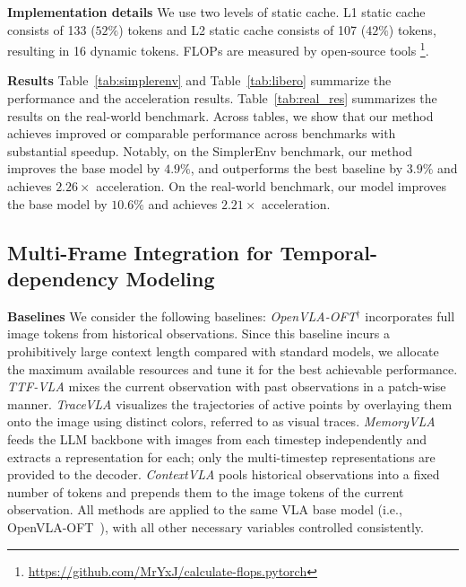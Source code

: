 \noindent\textbf{Implementation details} We use two levels of static cache. L1 static cache consists of 133 ($52\%$) tokens and L2 static cache consists of 107 ($42\%$) tokens, resulting in 16 dynamic tokens. FLOPs are measured by open-source tools \footnote{\url{https://github.com/MrYxJ/calculate-flops.pytorch}}.

\noindent\textbf{Results}
Table~\ref{tab:simplerenv}  and Table~\ref{tab:libero} summarize the performance and the acceleration results. Table~\ref{tab:real_res} summarizes the results on the real-world benchmark. Across tables, we show that our method achieves improved or comparable performance across benchmarks with substantial speedup. Notably, on the SimplerEnv benchmark, our method improves the base model by $4.9\%$, and outperforms the best baseline by $3.9\%$ and achieves $2.26\times$ acceleration.  On the real-world benchmark, our model improves the base model by $10.6\%$ and achieves $2.21\times$ acceleration.

\subsection{Multi-Frame Integration for Temporal-dependency Modeling} 

\noindent\textbf{Baselines}
We consider the following baselines: \emph{OpenVLA-OFT$^\dagger$} incorporates full image tokens from historical observations. Since this baseline incurs a prohibitively large context length compared with standard models, we allocate the maximum available resources and tune it for the best achievable performance. \emph{TTF-VLA} \citep{liu2025ttf} mixes the current observation with past observations in a patch-wise manner. \emph{TraceVLA} \citep{zheng2024tracevla} visualizes the trajectories of active points by overlaying them onto the image using distinct colors, referred to as visual traces. \emph{MemoryVLA} \citep{shi2025memoryvlaperceptualcognitivememoryvisionlanguageaction} feeds the LLM backbone with images from each timestep independently and extracts a representation for each; only the multi-timestep representations are provided to the decoder. \emph{ContextVLA} \citep{jang2025contextvla} pools historical observations into a fixed number of tokens and prepends them to the image tokens of the current observation. All methods are applied to the same VLA base model (i.e., OpenVLA-OFT~\citep{kim2025fine}), with all other necessary variables controlled consistently.


